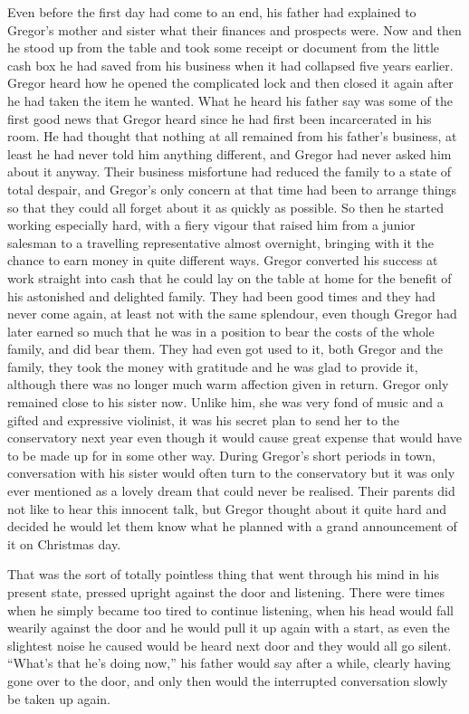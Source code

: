 \documentclass[12pt]{report}
\begin{document}
Even before the first day had come to an end, his father had explained
to Gregor's mother and sister what their finances and prospects were.
Now and then he stood up from the table and took some receipt or
document from the little cash box he had saved from his business when it
had collapsed five years earlier. Gregor heard how he opened the
complicated lock and then closed it again after he had taken the item he
wanted. What he heard his father say was some of the first good news
that Gregor heard since he had first been incarcerated in his room. He
had thought that nothing at all remained from his father's business, at
least he had never told him anything different, and Gregor had never
asked him about it anyway. Their business misfortune had reduced the
family to a state of total despair, and Gregor's only concern at that
time had been to arrange things so that they could all forget about it
as quickly as possible. So then he started working especially hard, with
a fiery vigour that raised him from a junior salesman to a travelling
representative almost overnight, bringing with it the chance to earn
money in quite different ways. Gregor converted his success at work
straight into cash that he could lay on the table at home for the
benefit of his astonished and delighted family. They had been good times
and they had never come again, at least not with the same splendour,
even though Gregor had later earned so much that he was in a position to
bear the costs of the whole family, and did bear them. They had even got
used to it, both Gregor and the family, they took the money with
gratitude and he was glad to provide it, although there was no longer
much warm affection given in return. Gregor only remained close to his
sister now. Unlike him, she was very fond of music and a gifted and
expressive violinist, it was his secret plan to send her to the
conservatory next year even though it would cause great expense that
would have to be made up for in some other way. During Gregor's short
periods in town, conversation with his sister would often turn to the
conservatory but it was only ever mentioned as a lovely dream that could
never be realised. Their parents did not like to hear this innocent
talk, but Gregor thought about it quite hard and decided he would let
them know what he planned with a grand announcement of it on Christmas
day.

That was the sort of totally pointless thing that went through his mind
in his present state, pressed upright against the door and listening.
There were times when he simply became too tired to continue listening,
when his head would fall wearily against the door and he would pull it
up again with a start, as even the slightest noise he caused would be
heard next door and they would all go silent. ``What's that he's doing
now,'' his father would say after a while, clearly having gone over to
the door, and only then would the interrupted conversation slowly be
taken up again.
\end{document}
